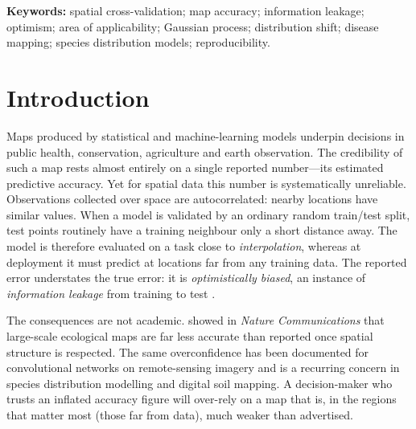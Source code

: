 \documentclass[11pt,a4paper]{article}
\begin{document}
\noindent\textbf{Keywords:} spatial cross-validation; map accuracy; information
leakage; optimism; area of applicability; Gaussian process; distribution shift;
disease mapping; species distribution models; reproducibility.

\bigskip
\onehalfspacing

\section{Introduction}\label{sec:intro}

Maps produced by statistical and machine-learning models underpin decisions in
public health, conservation, agriculture and earth observation. The credibility of
such a map rests almost entirely on a single reported number---its estimated
predictive accuracy. Yet for spatial data this number is systematically
unreliable. Observations collected over space are autocorrelated: nearby locations
have similar values. When a model is validated by an ordinary random train/test
split, test points routinely have a training neighbour only a short distance
away. The model is therefore evaluated on a task close to \emph{interpolation},
whereas at deployment it must predict at locations far from any training data. The
reported error understates the true error: it is \emph{optimistically biased}, an
instance of \emph{information leakage} from training to test \citep{roberts2017crossvalidation,
ploton2020spatial, kattenborn2022spatially}.

The consequences are not academic. \citet{ploton2020spatial} showed in
\emph{Nature Communications} that large-scale ecological maps are far less accurate
than reported once spatial structure is respected. The same overconfidence has been
documented for convolutional networks on remote-sensing imagery
\citep{kattenborn2022spatially} and is a recurring concern in species distribution
modelling and digital soil mapping. A decision-maker who trusts an inflated
accuracy figure will over-rely on a map that is, in the regions that matter most
(those far from data), much weaker than advertised.
\end{document}
